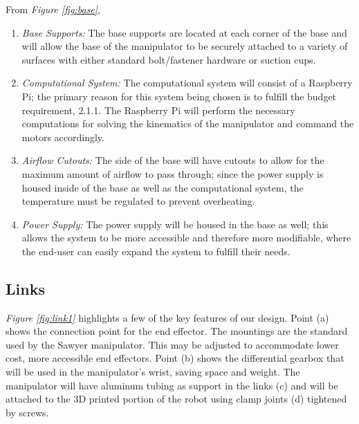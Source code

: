 \documentclass[12pt]{report}
\begin{document}
From \emph{Figure \ref{fig:base}},
\vspace{-\baselineskip}
\begin{enumerate}[label=\alph*.]
  \item \emph{Base Supports:}
  The base supports are located at each corner of the base and will allow the base of the manipulator to be securely attached to a variety of surfaces with either standard bolt/fastener hardware or suction cups.
  \item \emph{Computational System:}
  The computational system will consist of a Raspberry Pi; the primary reason for this system being chosen is to fulfill the budget requirement, 2.1.1. The Raspberry Pi will perform the necessary computations for solving the kinematics of the manipulator and command the motors accordingly.
  \item \emph{Airflow Cutouts:}
  The side of the base will have cutouts to allow for the maximum amount of airflow to pass through; since the power supply is housed inside of the base as well as the computational system, the temperature must be regulated to prevent overheating.
  \item \emph{Power Supply:}
  The power supply will be housed in the base as well; this allows the system to be more accessible and therefore more modifiable, where the end-user can easily expand the system to fulfill their needs.
\end{enumerate}
\subsection{Links}
\emph{Figure \ref{fig:link1}} highlights a few of the key features of our design. Point (a) shows the connection point for the end effector. The mountings are the standard used by the Sawyer manipulator. This may be adjusted to accommodate lower cost, more accessible end effectors. Point (b) shows the differential gearbox that will be used in the manipulator’s wrist, saving space and weight. The manipulator will have aluminum tubing as support in the links (c) and will be attached to the 3D printed portion of the robot using clamp joints (d) tightened by screws.
\end{document}
